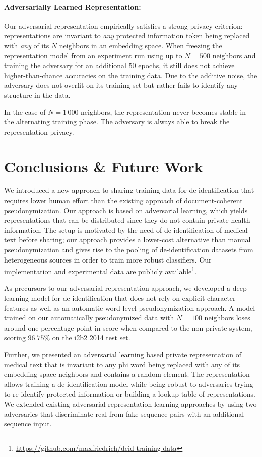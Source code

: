\paragraph{Adversarially Learned Representation:}
%
Our adversarial representation empirically satisfies a strong privacy criterion: representations are invariant to \textit{any} protected information token being replaced with \textit{any} of its $N$ neighbors in an embedding space.
%
When freezing the representation model from an experiment run using up to $N = 500$ neighbors and training the adversary for an additional $50$ epochs, it still does not achieve higher-than-chance accuracies on the training data.
%
Due to the additive noise, the adversary does not overfit on its training set but rather fails to identify any structure in the data.

%
In the case of $N = 1\,000$ neighbors, the representation never becomes stable in the alternating training phase.
%
The adversary is always able to break the representation privacy.

\section{Conclusions \& Future Work}
%
We introduced a new approach to sharing training data for de-identification that requires
lower human effort than the existing approach of document-coherent pseudonymization.
%
Our approach is based on adversarial learning, which yields representations that can be distributed since they do not contain private health information.
%
The setup is motivated by the need of de-identification of medical text before sharing; our approach provides a lower-cost alternative than manual pseudonymization and gives rise to the pooling of de-identification datasets from heterogeneous sources in order to train more robust classifiers.
%
Our implementation and experimental data are publicly available\footnote{\url{https://github.com/maxfriedrich/deid-training-data}}.

As precursors to our adversarial representation approach, we developed a deep learning model for de-identification that does not rely on explicit character features as well as an automatic word-level pseudonymization approach.
%
A model trained on our automatically pseudonymized data with $N=100$ neighbors loses around one percentage point in \fone score when compared to the non-private system, scoring $96.75\%$ on the i2b2 2014 test set.

%
Further, we presented an adversarial learning based private representation of medical text that is invariant to any \ac{phi} word being replaced with any of its embedding space neighbors and contains a random element.
%
The representation allows training a de-identification model while being robust to adversaries trying to re-identify protected information or building a lookup table of representations.
%
We extended existing adversarial representation learning approaches by using two adversaries that discriminate real from fake sequence pairs with an additional sequence input.

